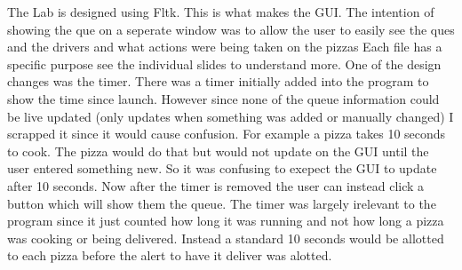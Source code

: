 The Lab is designed using Fltk. This is what makes the G\+U\+I. The intention of showing the que on a seperate window was to allow the user to easily see the ques and the drivers and what actions were being taken on the pizzas Each file has a specific purpose see the individual slides to understand more. One of the design changes was the timer. There was a timer initially added into the program to show the time since launch. However since none of the queue information could be live updated (only updates when something was added or manually changed) I scrapped it since it would cause confusion. For example a pizza takes 10 seconds to cook. The pizza would do that but would not update on the G\+U\+I until the user entered something new. So it was confusing to exepect the G\+U\+I to update after 10 seconds. Now after the timer is removed the user can instead click a button which will show them the queue. The timer was largely irelevant to the program since it just counted how long it was running and not how long a pizza was cooking or being delivered. Instead a standard 10 seconds would be allotted to each pizza before the alert to have it deliver was alotted. 